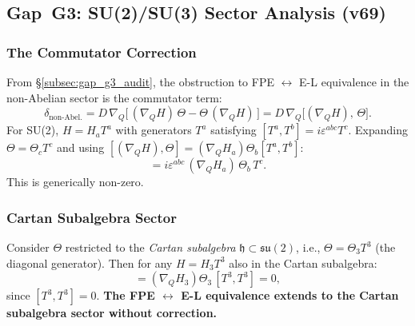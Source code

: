 \documentclass[12pt,a4paper]{article}
\theoremstyle{definition}
\theoremstyle{remark}
\begin{document}
\subsection{Gap~G3: SU(2)/SU(3) Sector Analysis (v69)}
\label{subsec:gap_g3_su2_su3}


\subsubsection{The Commutator Correction}

From §\ref{subsec:gap_g3_audit}, the obstruction to FPE $\leftrightarrow$
E-L equivalence in the non-Abelian sector is the commutator term:
\begin{equation}
  \delta_{\text{non-Abel.}}
  = D\,\nabla_Q\bigl[\,(\nabla_Q H)\,\Theta - \Theta\,(\nabla_Q H)\,\bigr]
  = D\,\nabla_Q\bigl[(\nabla_Q H),\,\Theta\bigr].
  \label{eq:correction_term}
\end{equation}
For SU(2), $H = H_a T^a$ with generators $T^a$ satisfying
$[T^a, T^b] = i\varepsilon^{abc}T^c$.
Expanding $\Theta = \Theta_c T^c$ and using
$[(\nabla_Q H), \Theta] = (\nabla_Q H_a)\Theta_b [T^a, T^b]$:
\begin{equation}
  [(\nabla_Q H), \Theta]
  = i\varepsilon^{abc}\,(\nabla_Q H_a)\,\Theta_b\,T^c.
  \label{eq:su2_commutator}
\end{equation}
This is generically non-zero.

\subsubsection{Cartan Subalgebra Sector}

Consider $\Theta$ restricted to the \emph{Cartan subalgebra}
$\mathfrak{h} \subset \mathfrak{su}(2)$, i.e., $\Theta = \Theta_3 T^3$
(the diagonal generator).  Then for any $H = H_3 T^3$ also in the
Cartan subalgebra:
\begin{equation}
  [(\nabla_Q H), \Theta]
  = (\nabla_Q H_3)\Theta_3\,[T^3, T^3] = 0,
  \label{eq:cartan_commutes}
\end{equation}
since $[T^3, T^3] = 0$.  \textbf{The FPE $\leftrightarrow$ E-L
equivalence extends to the Cartan subalgebra sector without correction.}
\end{document}
